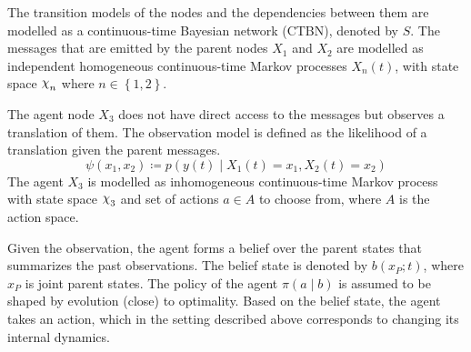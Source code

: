 The transition models of the nodes and the dependencies between them are modelled as a continuous-time Bayesian network (CTBN), denoted by $ S $. %
The messages that are emitted by the parent nodes $X_{1}$ and $ X_{2} $ are modelled as independent homogeneous continuous-time Markov processes $X_{n}(t)$, with state space $ \rchi_{n} $ where $ n \in \left\lbrace 1,2 \right\rbrace $.\par
The agent node $ X_3 $ does not have direct access to the messages but observes a translation of them. The observation model is defined as the likelihood of a translation given the parent messages.
\begin{equation}
\psi(x_1, x_2) \coloneqq p(y(t) \mid X_{1}(t)=x_1, X_{2}(t)=x_2)
\end{equation}
The agent  $ X_{3} $ is modelled as inhomogeneous continuous-time Markov process with state space $ \rchi_{3} $ and set of actions $ a \in A $ to choose from, where $ A $ is the action space. \par
Given the observation, the agent forms a belief over the parent states that summarizes the past observations. The belief state is denoted by $ b(x_P; t) $, where $ x_P $ is joint parent states. The policy of the agent $ \pi(a \mid b) $ is assumed to be shaped by evolution (close) to optimality. Based on the belief state, the agent takes an action, which in the setting described above corresponds to changing its internal dynamics. 


